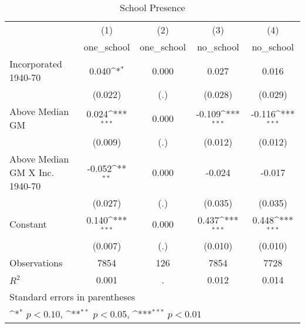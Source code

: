 \begin{table}[htbp]\centering
\def\sym#1{\ifmmode^{#1}\else\(^{#1}\)\fi}
\caption{School Presence}
\begin{tabular}{l*{4}{c}}
\hline\hline
                    &\multicolumn{1}{c}{(1)}&\multicolumn{1}{c}{(2)}&\multicolumn{1}{c}{(3)}&\multicolumn{1}{c}{(4)}\\
                    &\multicolumn{1}{c}{one\_school}&\multicolumn{1}{c}{one\_school}&\multicolumn{1}{c}{no\_school}&\multicolumn{1}{c}{no\_school}\\
\hline
Incorporated 1940-70&       0.040\sym{*}  &       0.000         &       0.027         &       0.016         \\
                    &     (0.022)         &         (.)         &     (0.028)         &     (0.029)         \\
[1em]
Above Median GM     &       0.024\sym{***}&       0.000         &      -0.109\sym{***}&      -0.116\sym{***}\\
                    &     (0.009)         &         (.)         &     (0.012)         &     (0.012)         \\
[1em]
Above Median GM X Inc. 1940-70&      -0.052\sym{**} &       0.000         &      -0.024         &      -0.017         \\
                    &     (0.027)         &         (.)         &     (0.035)         &     (0.035)         \\
[1em]
Constant            &       0.140\sym{***}&       0.000         &       0.437\sym{***}&       0.448\sym{***}\\
                    &     (0.007)         &         (.)         &     (0.010)         &     (0.010)         \\
\hline
Observations        &        7854         &         126         &        7854         &        7728         \\
\(R^{2}\)           &       0.001         &           .         &       0.012         &       0.014         \\
\hline\hline
\multicolumn{5}{l}{\footnotesize Standard errors in parentheses}\\
\multicolumn{5}{l}{\footnotesize \sym{*} \(p<0.10\), \sym{**} \(p<0.05\), \sym{***} \(p<0.01\)}\\
\end{tabular}
\end{table}
